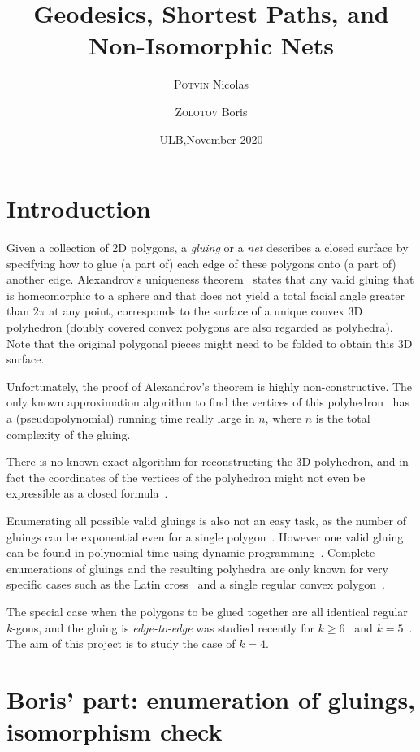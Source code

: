 \documentclass[a4paper,11pt]{article}
\title{Geodesics, Shortest Paths, and Non-Isomorphic Nets}
\author{{\scshape Potvin} Nicolas \and {\scshape Zolotov} Boris}
\date{ULB,\quad November 2020}
\begin{document}
 \maketitle

\section{Introduction}

Given a collection of 2D polygons, a \emph{gluing} or a \emph{net} describes a closed surface by specifying how to glue (a part of) each edge of these polygons onto (a part of) another edge. Alexandrov's uniqueness theorem~\cite{alex} states that any valid gluing that is homeomorphic to a sphere and that does not yield a total facial angle greater than $2\pi$ at any point, corresponds to the surface of a unique convex 3D polyhedron (doubly covered convex polygons are also regarded as polyhedra). Note that the original polygonal pieces might need to be folded to obtain this 3D surface.

Unfortunately, the proof of Alexandrov's theorem is highly non-constructive. The only known approximation algorithm to find the vertices of this polyhedron~\cite{kpd09-approx} has a (pseudopolynomial) running time really large in $n$, where $n$ is the total complexity of the gluing.

There is no known exact algorithm for reconstructing the 3D polyhedron, and in fact the coordinates of the vertices of the polyhedron might not even be expressible as a closed formula~\cite{bannister2014galois}.

Enumerating all possible valid gluings is also not an easy task, as the number of gluings can be exponential even for a single polygon~\cite{DDLO02}. However one valid gluing can be found in polynomial time using dynamic programming~\cite{DO07,lo96-dynprog}. Complete enumerations of gluings and the resulting polyhedra are only known for very specific cases such as the Latin cross~\cite{ddlop99} and a single regular convex polygon~\cite{DO07}.

The special case when the polygons to be glued together are all identical regular $k$-gons, and the gluing is \emph{edge-to-edge} was studied recently for $k \ge 6$~\cite{kl17-hex} and $k=5$~\cite{alz-penta}. The aim of this project is to study the case of $k=4$.



\section{Boris' part: enumeration of gluings, isomorphism check}
\end{document}
